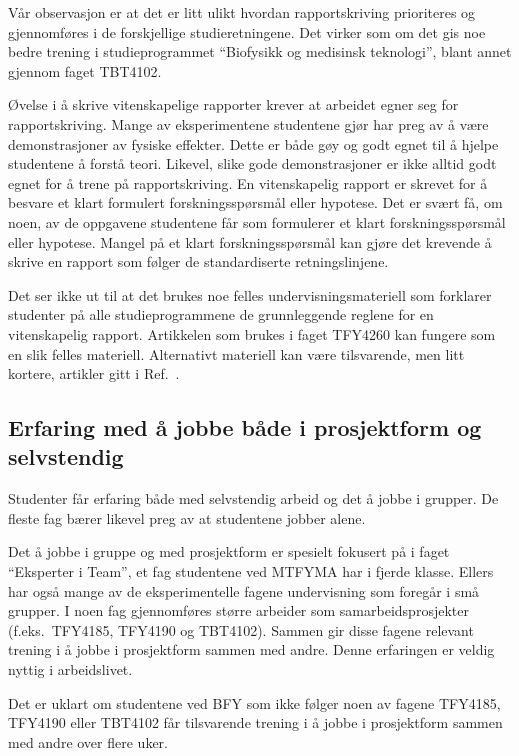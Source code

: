 \documentclass{article}
\begin{document}
Vår observasjon er at det er litt ulikt hvordan rapportskriving prioriteres og gjennomføres i de forskjellige studieretningene. Det virker som om det gis noe bedre trening i studieprogrammet ``Biofysikk og medisinsk teknologi'', blant annet gjennom faget TBT4102.

Øvelse i å skrive vitenskapelige rapporter krever at arbeidet egner seg for rapportskriving. Mange av eksperimentene studentene gjør har preg av å være demonstrasjoner av fysiske effekter. Dette er både gøy og godt egnet til å hjelpe studentene å forstå teori. Likevel, slike gode demonstrasjoner er ikke alltid godt egnet for å trene på rapportskriving. En vitenskapelig rapport er skrevet for å besvare et klart formulert forskningsspørsmål eller hypotese. Det er svært få, om noen, av de oppgavene studentene får som formulerer et klart forskningsspørsmål eller hypotese. Mangel på et klart forskningsspørsmål kan gjøre det krevende å skrive en rapport som følger de standardiserte retningslinjene.

Det ser ikke ut til at det brukes noe felles undervisningsmateriell som forklarer studenter på alle studieprogrammene de grunnleggende reglene for en vitenskapelig rapport. Artikkelen som brukes i faget TFY4260 kan fungere som en slik felles materiell. Alternativt materiell kan være tilsvarende, men litt kortere, artikler gitt i Ref.~\cite{Lapin1994,Senturia2003}.

\subsection{Erfaring med å jobbe både i prosjektform og selvstendig}
Studenter får erfaring både med selvstendig arbeid og det å jobbe i grupper. De fleste fag bærer likevel preg av at studentene jobber alene.

Det å jobbe i gruppe og med prosjektform er spesielt fokusert på i faget ``Eksperter i Team'', et fag studentene ved MTFYMA har i fjerde klasse. Ellers har også mange av de eksperimentelle fagene undervisning som foregår i små grupper. I noen fag gjennomføres større arbeider som samarbeidsprosjekter (f.eks.~TFY4185, TFY4190 og TBT4102). Sammen gir disse fagene relevant trening i å jobbe i prosjektform sammen med andre. Denne erfaringen er veldig nyttig i arbeidslivet.

Det er uklart om studentene ved BFY som ikke følger noen av fagene TFY4185, TFY4190 eller TBT4102 får tilsvarende trening i å jobbe i prosjektform sammen med andre over flere uker.
\end{document}
